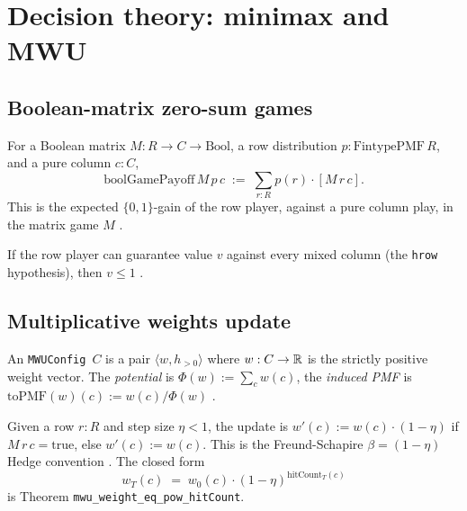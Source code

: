 \chapter{Decision theory: minimax and MWU}\label{chap:decision}

\section{Boolean-matrix zero-sum games}\label{sec:bool-game}

\begin{defn}
\label{def:bool-game-payoff}
  \leanok
For a Boolean matrix $M : R \to C \to \mathrm{Bool}$, a row
distribution $p : \mathrm{FintypePMF}\,R$, and a pure column
$c : C$,
\[
  \mathrm{boolGamePayoff}\,M\,p\,c \;:=\; \sum_{r : R} p(r) \cdot [M\,r\,c].
\]
This is the expected $\{0, 1\}$-gain of the row player, against a
pure column play, in the matrix game $M$ \cite{freund1999games}.
\end{defn}

\begin{thm}
\label{thm:minimax-value-le-one}
  \leanok
If the row player can guarantee value $v$ against every mixed
column (the \texttt{hrow} hypothesis), then $v \le 1$
\cite{freund1999games}.
\end{thm}

\section{Multiplicative weights update}\label{sec:mwu}

\begin{defn}
\label{def:mwu-config}
  \leanok
An \texttt{MWUConfig}~$C$ is a pair $\langle w, h_{>0} \rangle$ where
$w : C \to \mathbb{R}$ is the strictly positive weight vector. The
\emph{potential} is $\Phi(w) := \sum_c w(c)$, the \emph{induced PMF}
is $\mathrm{toPMF}(w)(c) := w(c) / \Phi(w)$
\cite[Thm 2.1]{arora2012multiplicative}.
\end{defn}

\begin{defn}
\label{def:mwu-update}
  \leanok
Given a row $r : R$ and step size $\eta < 1$, the update is
$w'(c) := w(c) \cdot (1 - \eta)$ if $M\,r\,c = \mathrm{true}$, else
$w'(c) := w(c)$. This is the Freund-Schapire
$\beta = (1 - \eta)$ Hedge convention \cite{freund1997}.
The closed form
\[
  w_T(c) \;=\; w_0(c) \cdot (1 - \eta)^{\mathrm{hitCount}_T(c)}
\]
is Theorem \texttt{mwu\_weight\_eq\_pow\_hitCount}.
\end{defn}

